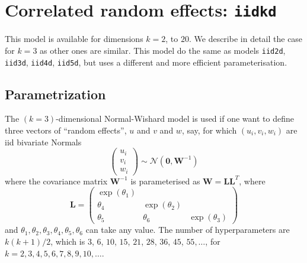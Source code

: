 \documentclass[a4paper,11pt]{article}
\begin{document}
\section*{Correlated random effects: \texttt{iidkd}}

This model is available for dimensions $k=2$, to $20$. We describe in
detail the case for $k=3$ as other ones are similar. This model do the
same as models \texttt{iid2d}, \texttt{iid3d}, \texttt{iid4d},
\texttt{iid5d}, but uses a different and more efficient parameterisation. 

\subsection*{Parametrization}

The $(k=3)$-dimensional Normal-Wishard model is used if one want to define
three vectors of ``random effects'', $u$ and $v$ and $w$, say, for which
$(u_{i}, v_{i}, w_i)$ are iid bivariate Normals
\begin{displaymath}
    \left(
      \begin{array}{c}
        u_{i}\\
        v_{i}\\
        w_{i}
      \end{array}\right)
    \sim \mathcal{N}\left(\mathbf{0}, \mathbf{W}^{-1}\right)
\end{displaymath}
where the  covariance matrix $\mathbf{W}^{-1}$ is parameterised as
$\mathbf{W}=\mathbf{L}\mathbf{L}^{T}$, where
\begin{equation}
    \label{precision}
    \mathbf{L} = \left(\begin{array}{ccc}
                         \exp(\theta_1) & & \\
                         \theta_4 & \exp(\theta_2) & \\
                         \theta_5 & \theta_6 & \exp(\theta_3)
      \end{array}\right)
\end{equation}
and $\theta_1, \theta_2, \theta_3, \theta_4, \theta_5, \theta_6$ can
take any value. The number of hyperparameters are $k(k+1)/2$, which is
$3$, $6$, $10$, $15$, $21$, $28$, $36$, $45$, $55, \ldots$, for
$k=2, 3, 4, 5, 6, 7, 8, 9, 10, \ldots$.
\end{document}
